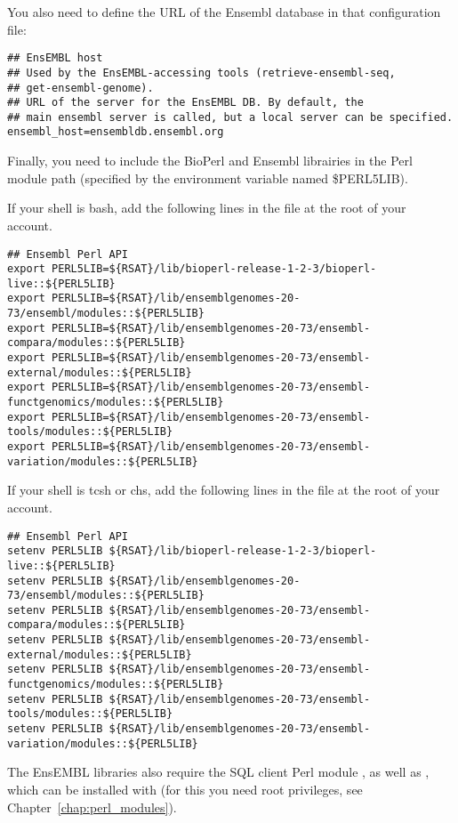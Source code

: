 \documentclass[12pt,a4paper, oneside]{scrreprt} %
\begin{document}
You also need to define the URL of the Ensembl database in that
configuration file:

\begin{lstlisting}
## EnsEMBL host
## Used by the EnsEMBL-accessing tools (retrieve-ensembl-seq,
## get-ensembl-genome).
## URL of the server for the EnsEMBL DB. By default, the
## main ensembl server is called, but a local server can be specified.
ensembl_host=ensembldb.ensembl.org
\end{lstlisting}

Finally, you need to include the BioPerl and Ensembl librairies in the
Perl module path (specified by the environment variable named
\$PERL5LIB).

If your shell is bash, add the following lines in the file
 at the root of your account.

\begin{lstlisting}
## Ensembl Perl API
export PERL5LIB=${RSAT}/lib/bioperl-release-1-2-3/bioperl-live::${PERL5LIB}
export PERL5LIB=${RSAT}/lib/ensemblgenomes-20-73/ensembl/modules::${PERL5LIB}
export PERL5LIB=${RSAT}/lib/ensemblgenomes-20-73/ensembl-compara/modules::${PERL5LIB}
export PERL5LIB=${RSAT}/lib/ensemblgenomes-20-73/ensembl-external/modules::${PERL5LIB}
export PERL5LIB=${RSAT}/lib/ensemblgenomes-20-73/ensembl-functgenomics/modules::${PERL5LIB}
export PERL5LIB=${RSAT}/lib/ensemblgenomes-20-73/ensembl-tools/modules::${PERL5LIB}
export PERL5LIB=${RSAT}/lib/ensemblgenomes-20-73/ensembl-variation/modules::${PERL5LIB}
\end{lstlisting}

If your shell is tcsh or chs, add the following lines in the file
 at the root of your account.

\begin{lstlisting}
## Ensembl Perl API
setenv PERL5LIB ${RSAT}/lib/bioperl-release-1-2-3/bioperl-live::${PERL5LIB}
setenv PERL5LIB ${RSAT}/lib/ensemblgenomes-20-73/ensembl/modules::${PERL5LIB}
setenv PERL5LIB ${RSAT}/lib/ensemblgenomes-20-73/ensembl-compara/modules::${PERL5LIB}
setenv PERL5LIB ${RSAT}/lib/ensemblgenomes-20-73/ensembl-external/modules::${PERL5LIB}
setenv PERL5LIB ${RSAT}/lib/ensemblgenomes-20-73/ensembl-functgenomics/modules::${PERL5LIB}
setenv PERL5LIB ${RSAT}/lib/ensemblgenomes-20-73/ensembl-tools/modules::${PERL5LIB}
setenv PERL5LIB ${RSAT}/lib/ensemblgenomes-20-73/ensembl-variation/modules::${PERL5LIB}
\end{lstlisting}

The EnsEMBL libraries also require the SQL client Perl module
, as well as , which can be installed with
 (for this you need root privileges, see Chapter~\ref{chap:perl_modules}). 
\end{document}
